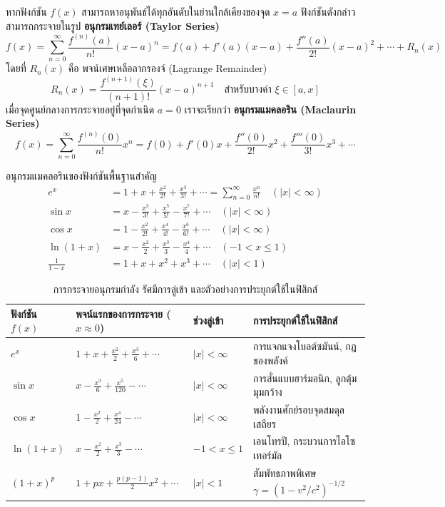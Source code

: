 หากฟังก์ชัน $f(x)$ สามารถหาอนุพันธ์ได้ทุกอันดับในย่านใกล้เคียงของจุด $x = a$ ฟังก์ชันดังกล่าวสามารถกระจายในรูป \textbf{อนุกรมเทย์เลอร์ (Taylor Series)}
\begin{equation}
f(x) = \sum_{n=0}^{\infty} \frac{f^{(n)}(a)}{n!}(x - a)^n = f(a) + f'(a)(x-a) + \frac{f''(a)}{2!}(x-a)^2 + \cdots + R_n(x)
\end{equation}
โดยที่ $R_n(x)$ คือ พจน์เศษเหลือลากรองจ์ (Lagrange Remainder)
\begin{equation}
R_n(x) = \frac{f^{(n+1)}(\xi)}{(n+1)!}(x - a)^{n+1} \quad \text{สำหรับบางค่า } \xi \in [a, x]
\end{equation}
เมื่อจุดศูนย์กลางการกระจายอยู่ที่จุดกำเนิด $a = 0$ เราจะเรียกว่า \textbf{อนุกรมแมคลอริน (Maclaurin Series)}
\begin{equation}
f(x) = \sum_{n=0}^{\infty} \frac{f^{(n)}(0)}{n!}x^n = f(0) + f'(0)x + \frac{f''(0)}{2!}x^2 + \frac{f'''(0)}{3!}x^3 + \cdots
\end{equation}

อนุกรมแมคลอรินของฟังก์ชันพื้นฐานสำคัญ
\begin{align}
e^x &= 1 + x + \frac{x^2}{2!} + \frac{x^3}{3!} + \cdots = \sum_{n=0}^{\infty} \frac{x^n}{n!} \quad (|x| < \infty) \\
\sin x &= x - \frac{x^3}{3!} + \frac{x^5}{5!} - \frac{x^7}{7!} + \cdots \quad (|x| < \infty) \\
\cos x &= 1 - \frac{x^2}{2!} + \frac{x^4}{4!} - \frac{x^6}{6!} + \cdots \quad (|x| < \infty) \\
\ln(1 + x) &= x - \frac{x^2}{2} + \frac{x^3}{3} - \frac{x^4}{4} + \cdots \quad (-1 < x \le 1) \\
\frac{1}{1 - x} &= 1 + x + x^2 + x^3 + \cdots \quad (|x| < 1)
\end{align}

\begin{table}[htbp]
    \centering
    \caption{การกระจายอนุกรมกำลัง รัศมีการลู่เข้า และตัวอย่างการประยุกต์ใช้ในฟิสิกส์}
    \label{tab:taylor_series_summary}
    \begin{tabularx}{\textwidth}{p{2.0cm}p{5.0cm}p{2.0cm}Y}
        \toprule
        \textbf{ฟังก์ชัน} $f(x)$ & \textbf{พจน์แรกของการกระจาย} ($x \approx 0$) & \textbf{ช่วงลู่เข้า} & \textbf{การประยุกต์ใช้ในฟิสิกส์} \\
        \midrule
        $e^x$ & $1 + x + \frac{x^2}{2} + \frac{x^3}{6} + \cdots$ & $|x| < \infty$ & การแจกแจงโบลต์ซมันน์, กฎของพลังค์ \\
        $\sin x$ & $x - \frac{x^3}{6} + \frac{x^5}{120} - \cdots$ & $|x| < \infty$ & การสั่นแบบฮาร์มอนิก, ลูกตุ้มมุมกว้าง \\
        $\cos x$ & $1 - \frac{x^2}{2} + \frac{x^4}{24} - \cdots$ & $|x| < \infty$ & พลังงานศักย์รอบจุดสมดุลเสถียร \\
        $\ln(1+x)$ & $x - \frac{x^2}{2} + \frac{x^3}{3} - \cdots$ & $-1 < x \le 1$ & เอนโทรปี, กระบวนการไอโซเทอร์มัล \\
        $(1+x)^p$ & $1 + px + \frac{p(p-1)}{2}x^2 + \cdots$ & $|x| < 1$ & สัมพัทธภาพพิเศษ $\gamma = (1-v^2/c^2)^{-1/2}$ \\
        \bottomrule
    \end{tabularx}
\end{table}

